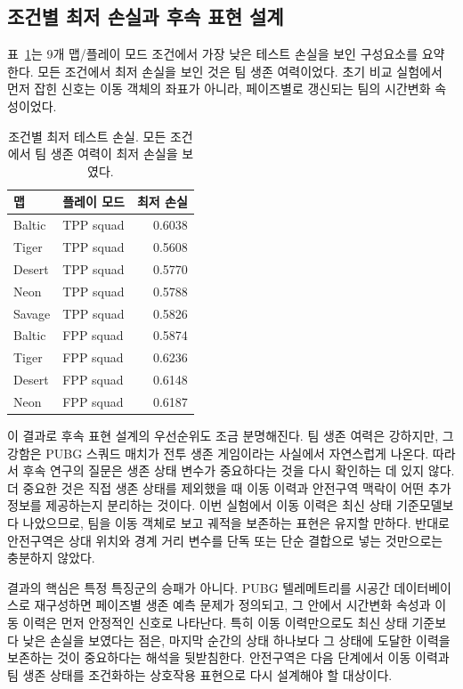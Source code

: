 \subsection{조건별 최저 손실과 후속 표현 설계}

표~\ref{tab:domain-winners}는 9개 맵/플레이 모드 조건에서 가장 낮은 테스트 손실을
보인 구성요소를 요약한다. 모든 조건에서 최저 손실을 보인 것은 팀 생존 여력이었다.
초기 비교 실험에서 먼저 잡힌 신호는 이동 객체의 좌표가 아니라, 페이즈별로 갱신되는
팀의 시간변화 속성이었다.

\begin{table}[t]
\centering
\caption{조건별 최저 테스트 손실. 모든 조건에서 팀 생존 여력이 최저 손실을 보였다.}
\label{tab:domain-winners}
\small
\begin{tabular}{llr}
\toprule
맵 & 플레이 모드 & 최저 손실 \\
\midrule
Baltic & TPP squad & 0.6038 \\
Tiger & TPP squad & 0.5608 \\
Desert & TPP squad & 0.5770 \\
Neon & TPP squad & 0.5788 \\
Savage & TPP squad & 0.5826 \\
Baltic & FPP squad & 0.5874 \\
Tiger & FPP squad & 0.6236 \\
Desert & FPP squad & 0.6148 \\
Neon & FPP squad & 0.6187 \\
\bottomrule
\end{tabular}
\end{table}

이 결과로 후속 표현 설계의 우선순위도 조금 분명해진다. 팀 생존 여력은 강하지만,
그 강함은 PUBG 스쿼드 매치가 전투 생존 게임이라는 사실에서 자연스럽게 나온다.
따라서 후속 연구의 질문은 생존 상태 변수가 중요하다는 것을 다시 확인하는 데 있지
않다. 더 중요한 것은 직접 생존 상태를 제외했을 때 이동 이력과 안전구역 맥락이
어떤 추가 정보를 제공하는지 분리하는 것이다. 이번 실험에서 이동
이력은 최신 상태 기준모델보다 나았으므로, 팀을 이동 객체로 보고 궤적을 보존하는
표현은 유지할 만하다. 반대로 안전구역은 상대 위치와 경계 거리 변수를 단독 또는
단순 결합으로 넣는 것만으로는 충분하지 않았다.

결과의 핵심은 특정 특징군의 승패가 아니다. PUBG 텔레메트리를 시공간 데이터베이스로
재구성하면 페이즈별 생존 예측 문제가 정의되고, 그 안에서 시간변화 속성과 이동
이력은 먼저 안정적인 신호로 나타난다. 특히 이동 이력만으로도 최신 상태 기준보다
낮은 손실을 보였다는 점은, 마지막 순간의 상태 하나보다 그 상태에 도달한 이력을
보존하는 것이 중요하다는 해석을 뒷받침한다. 안전구역은 다음 단계에서 이동 이력과
팀 생존 상태를 조건화하는 상호작용 표현으로 다시 설계해야 할 대상이다.
